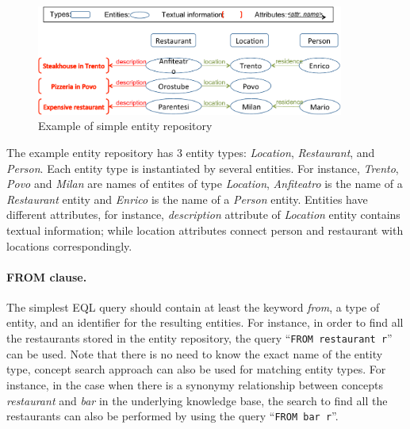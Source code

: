 \begin{figure}[htbp]
\centering
\includegraphics[width=0.90\textwidth]{figures/searchExample}
\caption{Example of simple entity repository}
\label{fig:search_example}
\end{figure}

The example entity repository has 3 entity types: \emph{Location}, \emph{Restaurant}, and \emph{Person}. Each entity type is instantiated by several entities. For instance, \emph{Trento}, \emph{Povo} and \emph{Milan} are names of entites of type \emph{Location}, \emph{Anfiteatro} is the name of a \emph{Restaurant} entity and \emph{Enrico} is the name of a \emph{Person} entity. Entities have different attributes, for instance, \emph{description} attribute of \emph{Location} entity contains textual information; while location attributes connect person and restaurant with locations correspondingly.

\paragraph{FROM clause.}
The simplest EQL query should contain at least the keyword \emph{from}, a type of entity, and an identifier for the resulting entities. For instance, in order to find all the restaurants stored in the entity repository, the query ``\texttt{FROM restaurant r}'' can be used.
Note that there is no need to know the exact name of the entity type, concept search approach can also be used for matching entity types. For instance, in the case when there is a synonymy relationship between concepts \emph{restaurant} and \emph{bar} in the underlying knowledge base, the search to find all the restaurants can also be performed by using the query ``\texttt{FROM bar r}''.

